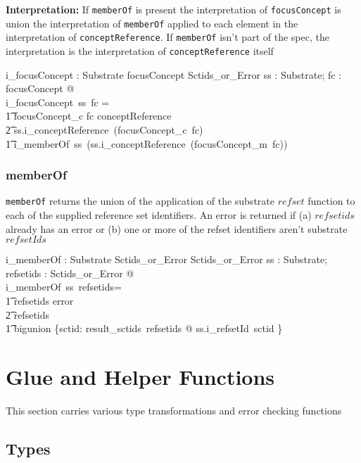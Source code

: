 \documentclass{article}
\def\spec#1{{\tt #1}}
\begin{document}
\textbf{Interpretation:}  If  \spec{memberOf} is present the interpretation of  \spec{focusConcept} is union the interpretation of \spec{memberOf} applied to
each element in the interpretation of \spec{conceptReference}.  If \spec{memberOf} isn't part of the spec, the interpretation is the interpretation of \spec{conceptReference} itself

\begin{gendef}
   i\_focusConcept : Substrate \fun focusConcept \fun Sctids\_or\_Error
\where
   \forall ss : Substrate; fc : focusConcept @ \\
i\_focusConcept~ss~fc = \\
\t1 \IF focusConcept\_c \inv fc \in conceptReference \\
\t2 \THEN ss.i\_conceptReference~(focusConcept\_c~\inv fc) \\
\t1 \ELSE  i\_memberOf~ss~(ss.i\_conceptReference~(focusConcept\_m~\inv fc)) 
\end{gendef}

\subsubsection{memberOf}
\spec{memberOf} returns the union of the application of the substrate $refset$ function to each of the supplied reference set identifiers.  An error is
returned if (a) $refsetids$ already has an error or (b) one or more of the refset identifiers aren't substrate $refsetIds$

\begin{gendef}
   i\_memberOf : Substrate \fun Sctids\_or\_Error \fun Sctids\_or\_Error 
\where
   \forall ss : Substrate; refsetids : Sctids\_or\_Error @ \\
i\_memberOf~ss~refsetids= \\
\t1 \IF refsetids \in \ran error \\
\t2 \THEN refsetids \\
\t1 \ELSE bigunion \{sctid: result\_sctids~refsetids @ ss.i\_refsetId~sctid \} 
\end{gendef}



\section{Glue and Helper Functions}
This section carries various type transformations and error checking functions

\subsection{Types}
\end{document}
